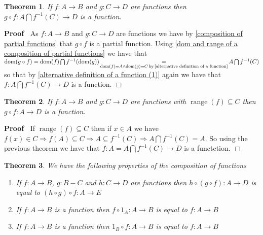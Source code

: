 \documentclass{book}
\newcommand{\equallim}{\mathop{=}\limits}
\newcommand{\tmop}[1]{\ensuremath{\operatorname{#1}}}
\newenvironment{proof}{\noindent\textbf{Proof\ }}{\hspace*{\fill}$\Box$\medskip}
\newtheorem{theorem}{Theorem}
\begin{document}
{{\begin{theorem}
  \label{composition of functions (3)}If $f : A \rightarrow B$ and $g : C
  \rightarrow D$ are functions then $g \circ f : A \bigcap f^{- 1} (C)
  \rightarrow D$ is a function.
\end{theorem}

\begin{proof}
  As $f : A \rightarrow B$ and $g : C \rightarrow D$ are functions we have by
  \ref{composition of partial functions} that $g \circ f$ is a partial
  function. Using \ref{dom and range of a composition of partial functions} we
  have that $\tmop{dom} (g \circ f) = \tmop{dom} (f) \bigcap f^{- 1}
  (\tmop{dom} (g)) \equallim_{\tmop{dom} (f) = A \wedge \tmop{dom} (g) = C
  \tmop{by} \text{\ref{alternative definition of a function}}} A \bigcap f^{-
  1} (C)$ so that by \ref{alternative definition of a function (1)} again we
  have that $f : A \bigcap f^{- 1} (C) \rightarrow D$ is a function.
\end{proof}

\begin{theorem}
  \label{composition of functions}If $f : A \rightarrow B$ and $g : C
  \rightarrow D$ are functions with $\tmop{range} (f) \subseteq C$ then $g
  \circ f : A \rightarrow D$ is a function.
\end{theorem}

\begin{proof}
  If $\tmop{range} (f) \subseteq C$ then if $x \in A$ we have $f (x) \in C
  \Rightarrow f (A) \subseteq C \Rightarrow A \subseteq f^{- 1} (C)
  \Rightarrow A \bigcap f^{- 1} (C) = A$. So using the previous theorem we
  have that $f : A = A \bigcap f^{- 1} (C) \rightarrow D$ is a functction.
\end{proof}

\begin{theorem}
  \label{properties of compositions}We have the following properties of the
  composition of functions
  \begin{enumerate}
    \item If $f : A \rightarrow B$, $g : B - C$ and $h : C \rightarrow D$ are
    functions then $h \circ (g \circ f) : A \rightarrow D$ is equal to $(h
    \circ g) \circ f : A \rightarrow E$
    
    \item If $f : A \rightarrow B$ is a function then $f \circ 1_A : A
    \rightarrow B$ is equal to $f : A \rightarrow B$
    
    \item If $f : A \rightarrow B$ is a function then $1_B \circ f : A
    \rightarrow B$ is equal to $f : A \rightarrow B$
  \end{enumerate}
\end{theorem}

}}
\end{document}
